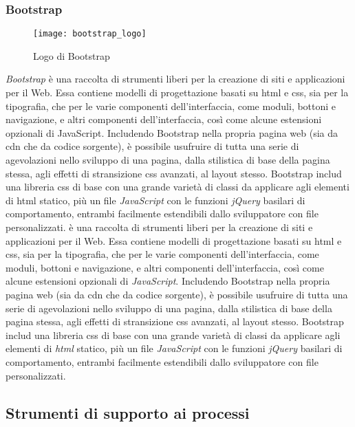 \subsubsection{Bootstrap}
\begin{figure}[htb] 
    \centering 
    \texttt{[image: bootstrap\_logo]} 
    \caption{Logo di Bootstrap}
\end{figure}
\emph{Bootstrap} è una raccolta di strumenti liberi per la creazione di siti e applicazioni per il Web. Essa contiene modelli di progettazione basati su \gls{html} e \gls{css}, sia per la tipografia, che per le varie componenti dell'interfaccia, come moduli, bottoni e navigazione, e altri componenti dell'interfaccia, così come alcune estensioni opzionali di JavaScript.
Includendo Bootstrap nella propria pagina web (sia da \gls{cdn} che da codice sorgente), è possibile usufruire di tutta una serie di agevolazioni nello sviluppo di una pagina, dalla stilistica di base della pagina stessa, agli effetti di stransizione \gls{css} avanzati, al layout stesso. 
Bootstrap includ una libreria \gls{css} di base con una grande varietà di classi da applicare agli elementi di \gls{html} statico, più un file \emph{JavaScript} con le funzioni \emph{jQuery} basilari di comportamento, entrambi facilmente estendibili dallo sviluppatore con file personalizzati. è una raccolta di strumenti liberi per la creazione di siti e applicazioni per il Web. Essa contiene modelli di progettazione basati su \gls{html} e \gls{css}, sia per la tipografia, che per le varie componenti dell'interfaccia, come moduli, bottoni e navigazione, e altri componenti dell'interfaccia, così come alcune estensioni opzionali di \emph{JavaScript}.
Includendo Bootstrap nella propria pagina web (sia da \gls{cdn} che da codice sorgente), è possibile usufruire di tutta una serie di agevolazioni nello sviluppo di una pagina, dalla stilistica di base della pagina stessa, agli effetti di stransizione \gls{css} avanzati, al layout stesso. 
Bootstrap includ una libreria \gls{css} di base con una grande varietà di classi da applicare agli elementi di \emph{html} statico, più un file \emph{JavaScript} con le funzioni \emph{jQuery} basilari di comportamento, entrambi facilmente estendibili dallo sviluppatore con file personalizzati.

\subsection{Strumenti di supporto ai processi}

